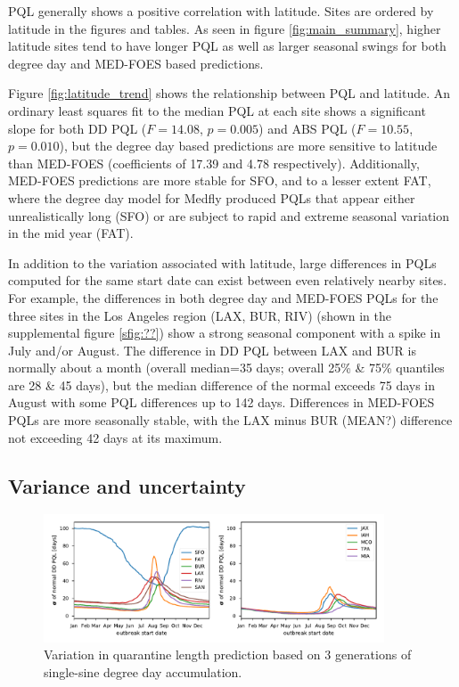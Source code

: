 \documentclass[10pt,a4paper,twocolumn]{article}
\begin{document}
PQL generally shows a positive correlation with latitude\cite{??}.
Sites are ordered by latitude in the figures and tables.
As seen in figure \ref{fig:main_summary}, higher latitude sites tend to have longer PQL 
as well as larger seasonal swings for both degree day and MED-FOES based predictions.

Figure \ref{fig:latitude_trend} shows the relationship between PQL and latitude.
An ordinary least squares fit to the median PQL at each site shows a significant slope for
both DD PQL ($F{=}14.08$, $p{=}0.005$) and ABS PQL ($F{=}10.55$, $p{=}0.010$), but
the degree day based predictions are more sensitive to latitude than MED-FOES
(coefficients of 17.39 and 4.78 respectively).
Additionally, MED-FOES predictions are more stable for SFO, and to a lesser extent FAT, 
where the degree day model for Medfly produced PQLs that appear either unrealistically long (SFO) 
or are subject to rapid and extreme seasonal variation in the mid year (FAT).

In addition to the variation associated with latitude, 
large differences in PQLs computed for the same start date 
can exist between even relatively nearby sites.
For example, the differences in both degree day and MED-FOES PQLs 
for the three sites in the Los Angeles region (LAX, BUR, RIV) 
(shown in the supplemental figure \ref{sfig:??})
show a strong seasonal component with a spike in July and/or August.
The difference in DD PQL between LAX and BUR is normally about a month
(overall median=35 days; overall 25\% \& 75\% quantiles are 28 \& 45 days), 
but the median difference of the normal exceeds 75 days in August with some 
PQL differences up to 142 days.
Differences in MED-FOES PQLs are more seasonally stable, 
with the LAX minus BUR (MEAN?) difference not exceeding 42 days at its maximum.


\subsection*{Variance and uncertainty}

\begin{figure}[ht!]
\centering
\includegraphics[width=0.9\textwidth]{figs/fig_BMDD_variation.pdf}
\caption{\label{fig:DD_variation_summary}Variation in quarantine length prediction 
based on 3 generations of single-sine degree day accumulation.}
\end{figure}
\end{document}
